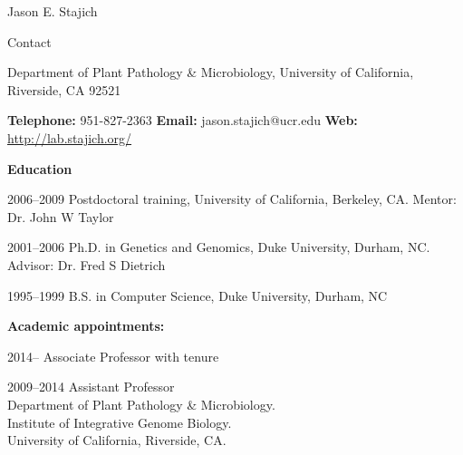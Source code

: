 \documentclass[10pt]{article}
\begin{document}


\newlength{\oldcvlabelwidth}
\renewcommand*{\cvbibname}{}

\begin{cv}{\centerline{Jason E. Stajich}}


\setlength{\cvlabelwidth}{18mm}
\begin{cvlistcompact}{Contact}
	\item Department of Plant Pathology \& Microbiology, University of California, Riverside, CA 92521 
	\item \textbf{Telephone:} 951-827-2363 \textbf{Email:} jason.stajich@ucr.edu \textbf{Web:} \url{http://lab.stajich.org/}
\end{cvlistcompact}

\begin{cvlistcompact}{\bf Education}
\item [2006--2009] Postdoctoral training, University of California, Berkeley, CA. Mentor: Dr. John W Taylor
\item [2001--2006] Ph.D. in Genetics and Genomics, Duke University, Durham, NC. Advisor: Dr. Fred S Dietrich
\item [1995--1999] B.S. in Computer Science, Duke University, Durham, NC
\end{cvlistcompact}

\begin{cvlistcompact}{\bf Academic appointments:}
\item [2014--] Associate Professor with tenure
\item [2009--2014] Assistant Professor \\
     Department of Plant Pathology \& Microbiology.  \\
     Institute of Integrative Genome Biology. \\ 
     University of California, Riverside, CA. 


\end{cvlistcompact}
\end{cv}
\end{document}
